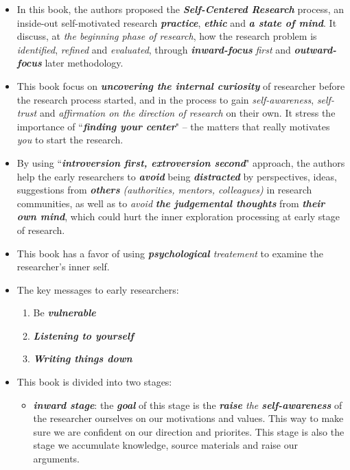 \documentclass[11pt]{article}
\begin{document}
\begin{itemize}
\item In this book, the authors proposed the \emph{\textbf{Self-Centered Research}} process, an inside-out self-motivated research \emph{\textbf{practice}}, \emph{\textbf{ethic}} and \emph{\textbf{a state of mind}}. It discuss, at \emph{the beginning phase of research}, how the research problem is \emph{identified}, \emph{refined} and \emph{evaluated}, through \emph{\textbf{inward-focus}} \emph{first} and \emph{\textbf{outward-focus}} later methodology. 

\item This book focus on \emph{\textbf{uncovering the internal curiosity}} of researcher before the research process started, and in the process to gain \emph{self-awareness}, \emph{self-trust} and \emph{affirmation on the direction of research} on their own. It stress the importance of ``\emph{\textbf{finding your center}}" -- the matters that really motivates \emph{you} to start the research.

\item By using ``\emph{\textbf{introversion first, extroversion second}}" approach, the authors help the early researchers to \emph{\textbf{avoid}} being \emph{\textbf{distracted}} by perspectives, ideas, suggestions from \emph{\textbf{others} (authorities, mentors, colleagues)} in research communities, as well as to \emph{avoid} \emph{\textbf{the judgemental thoughts}} from \emph{\textbf{their own mind}}, which could hurt the inner exploration processing at early stage of research. 

\item This book has a favor of using \emph{\textbf{psychological} treatement} to examine the researcher's inner self.

\item The key messages to early researchers:
\begin{enumerate}
\item Be  \emph{\textbf{vulnerable}}
\item \emph{\textbf{Listening to yourself}}
\item \emph{\textbf{Writing things down}}
\end{enumerate}

\item This book is divided into two stages:
\begin{itemize}
\item \emph{\textbf{inward stage}}: the \emph{\textbf{goal}} of this stage is the \emph{\textbf{raise} the \textbf{self-awareness}} of the researcher ourselves on our motivations and values. This way to make sure we are confident on our direction and priorites. This stage is also the stage we accumulate knowledge, source materials and raise our arguments.


\end{itemize}
\end{itemize}
\end{document}
